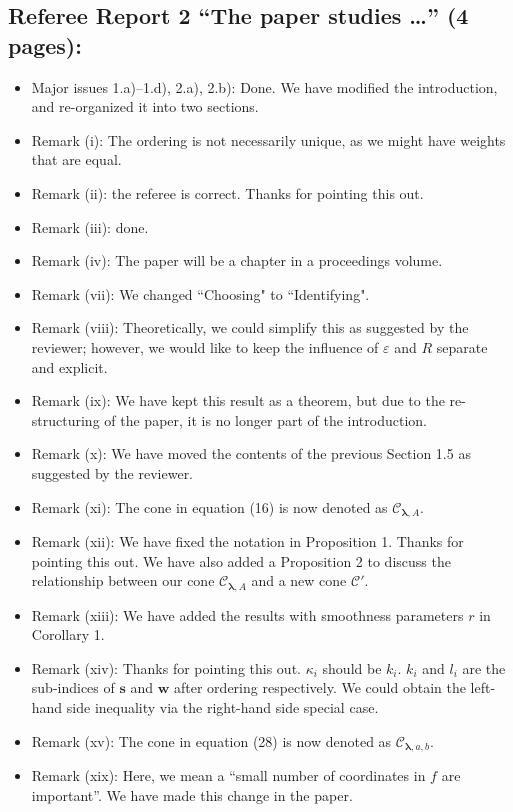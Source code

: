 \documentclass[11pt]{article}
\newcommand{\calC}{\mathcal{C}}
\begin{document}
\subsection*{Referee Report 2 ``The paper studies \ldots'' (4 pages):}

\begin{itemize}
\item Major issues 1.a)--1.d), 2.a), 2.b): Done. We have modified the introduction, and re-organized it into two sections. 
\item Remark (i): The ordering is not necessarily unique, as we might have weights 
that are equal. 
\item Remark (ii): the referee is correct. Thanks for pointing this out. 
\item Remark (iii): done. 
\item Remark (iv): The paper will be a chapter in a proceedings volume.
\item Remark (vii): We changed ``Choosing" to ``Identifying".
\item Remark (viii): Theoretically, we could simplify this as suggested by the reviewer; however, we would like to keep the influence of $\varepsilon$ and $R$ separate and explicit. 
\item Remark (ix): We have kept this result as a theorem, but due to the re-structuring of the paper, it is no longer part of the introduction. 
\item Remark (x): We have moved the contents of the previous Section 1.5 as suggested by the reviewer. 
\item Remark (xi): The cone in equation (16) is now denoted as $\calC_{\boldsymbol{\lambda},A}$. 
\item Remark (xii): We have fixed the notation in Proposition 1. Thanks for pointing this out. We have also added a Proposition 2 to discuss the relationship between our cone $\mathcal{C}_{\boldsymbol{\lambda},A}$ and a new cone $\mathcal{C}'$.
\item Remark (xiii): We have added the results with smoothness parameters $r$ in Corollary 1.
\item Remark (xiv): Thanks for pointing this out. $\kappa_i$ should be $k_i$. $k_i$ and $l_i$ are the sub-indices of $\boldsymbol{s}$ and $\boldsymbol{w}$ after ordering respectively. We could obtain the left-hand side inequality via the right-hand side special case.
\item Remark (xv): The cone in equation (28) is now denoted as $\calC_{\boldsymbol{\lambda},a,b}$. 
\item Remark (xix): Here, we mean a ``small number of coordinates in $f$ are important''. We have made this change in the paper.

\end{itemize}
\end{document}

